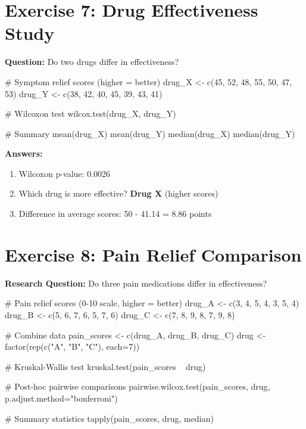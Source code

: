 \documentclass[11pt]{article}
\begin{document}
\section{Exercise 7: Drug Effectiveness Study}

\textbf{Question:} Do two drugs differ in effectiveness?

\begin{rcode}
# Symptom relief scores (higher = better)
drug_X <- c(45, 52, 48, 55, 50, 47, 53)
drug_Y <- c(38, 42, 40, 45, 39, 43, 41)

# Wilcoxon test
wilcox.test(drug_X, drug_Y)

# Summary
mean(drug_X)
mean(drug_Y)
median(drug_X)
median(drug_Y)
\end{rcode}

\textbf{Answers:}
\begin{enumerate}
\item \textcolor{answergreen}{Wilcoxon p-value: 0.0026}
\item \textcolor{answergreen}{Which drug is more effective? \textbf{Drug X} (higher scores)}
\item \textcolor{answergreen}{Difference in average scores: 50 - 41.14 = 8.86 points}
\end{enumerate}

\section{Exercise 8: Pain Relief Comparison}

\textbf{Research Question:} Do three pain medications differ in effectiveness?

\begin{rcode}
# Pain relief scores (0-10 scale, higher = better)
drug_A <- c(3, 4, 5, 4, 3, 5, 4)
drug_B <- c(5, 6, 7, 6, 5, 7, 6)
drug_C <- c(7, 8, 9, 8, 7, 9, 8)

# Combine data
pain_scores <- c(drug_A, drug_B, drug_C)
drug <- factor(rep(c("A", "B", "C"), each=7))

# Kruskal-Wallis test
kruskal.test(pain_scores ~ drug)

# Post-hoc pairwise comparisons
pairwise.wilcox.test(pain_scores, drug, p.adjust.method="bonferroni")

# Summary statistics
tapply(pain_scores, drug, median)
\end{rcode}
\end{document}
